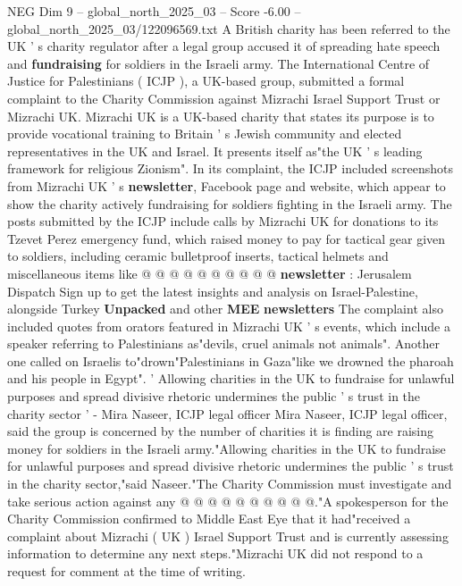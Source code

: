 \begin{textsample}{NEG Dim 9 – global\_north\_2025\_03 – Score -6.00 – global\_north\_2025\_03/122096569.txt}  \label{ex:f9_neg_075}
A British charity has been referred to the UK ' s charity regulator after a legal group accused it of spreading hate speech and \textbf{fundraising} for soldiers in the Israeli army.
The International Centre of Justice for Palestinians ( ICJP ), a UK-based group, submitted a formal complaint to the Charity Commission against Mizrachi Israel Support Trust or Mizrachi UK.
Mizrachi UK is a UK-based charity that states its purpose is to provide vocational training to Britain ' s Jewish community and elected representatives in the UK and Israel.
It presents itself as"the UK ' s leading framework for religious Zionism".
In its complaint, the ICJP included screenshots from Mizrachi UK ' s \textbf{newsletter}, Facebook page and website, which appear to show the charity actively fundraising for soldiers fighting in the Israeli army.
The posts submitted by the ICJP include calls by Mizrachi UK for donations to its Tzevet Perez emergency fund, which raised money to pay for tactical gear given to soldiers, including ceramic bulletproof inserts, tactical helmets and miscellaneous items like @ @ @ @ @ @ @ @ @ @ \textbf{newsletter} : Jerusalem Dispatch Sign up to get the latest insights and analysis on Israel-Palestine, alongside Turkey \textbf{Unpacked} and other \textbf{MEE} \textbf{newsletters} The complaint also included quotes from orators featured in Mizrachi UK ' s events, which include a speaker referring to Palestinians as"devils, cruel animals not animals".
Another one called on Israelis to"drown"Palestinians in Gaza"like we drowned the pharoah and his people in Egypt". ' Allowing charities in the UK to fundraise for unlawful purposes and spread divisive rhetoric undermines the public ' s trust in the charity sector ' - Mira Naseer, ICJP legal officer Mira Naseer, ICJP legal officer, said the group is concerned by the number of charities it is finding are raising money for soldiers in the Israeli army."Allowing charities in the UK to fundraise for unlawful purposes and spread divisive rhetoric undermines the public ' s trust in the charity sector,"said Naseer."The Charity Commission must investigate and take serious action against any @ @ @ @ @ @ @ @ @ @."A spokesperson for the Charity Commission confirmed to Middle East Eye that it had"received a complaint about Mizrachi ( UK ) Israel Support Trust and is currently assessing information to determine any next steps."Mizrachi UK did not respond to a request for comment at the time of writing.

\end{textsample}
